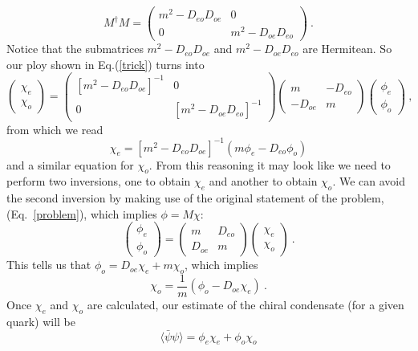 \[ M^\dagger M = \left( 
\begin{array}{cc}
m^2 - D_{eo} D_{oe} & 0 \\
0 &   m^2 - D_{oe} D_{eo}
\end{array} 
\right) \ . \]
Notice that the submatrices $m^2 - D_{eo} D_{oe}$ and $m^2 - D_{oe} D_{eo}$ are 
Hermitean. So our ploy shown in Eq.(\ref{trick}) turns into
\[ \left( \begin{array}{c}
\chi_e \\
\chi_o
\end{array} \right)
= \left( 
\begin{array}{cc}
\left[m^2 - D_{eo} D_{oe}\right]^{-1} & 0 \\
0 &   \left[m^2 - D_{oe} D_{eo} \right]^{-1}
\end{array}  
\right) \left( 
\begin{array}{cc}
m   &  -D_{eo} \\
-D_{oe}   & m
\end{array}\right)
\left(
\begin{array}{c}
\phi_e \\
\phi_o
\end{array}
\right) \ ,
\] 
from which we read
\begin{equation}
\chi_e = \left[m^2 - D_{eo} D_{oe}\right]^{-1} \left( m \phi_e - D_{eo} 
\phi_o\right)
\end{equation}
and a similar equation for $\chi_o$. From this reasoning it may look like we 
need to perform two inversions, one to obtain $\chi_e$ and another to obtain 
$\chi_o$. We can avoid the second inversion by making use of the original 
statement of the problem, (Eq.~\ref{problem}), which implies $\phi = M \chi$:
\[
\left( \begin{array}{c}
\phi_e \\
\phi_o
\end{array}
\right)  =   \left( \begin{array}{cc}
m & D_{eo} \\
D_{oe} & m 
\end{array}
\right) \left( 
\begin{array}{c}
 \chi_e \\
 \chi_o
\end{array}
 \right) \ . 
\]
This tells us that $\phi_o = D_{oe} \chi_e + m \chi_o$, which implies
\[
 \chi_o = \frac{1}{m} \left( \phi_o - D_{oe} \chi_e \right) \ . 
\]
Once $\chi_e$ and $\chi_o$ are calculated, our estimate of the chiral 
condensate (for a given quark) will be
\begin{equation}
\langle \bar{\psi} \psi \rangle = \phi_e\chi_e + \phi_o \chi_o  
\end{equation}


